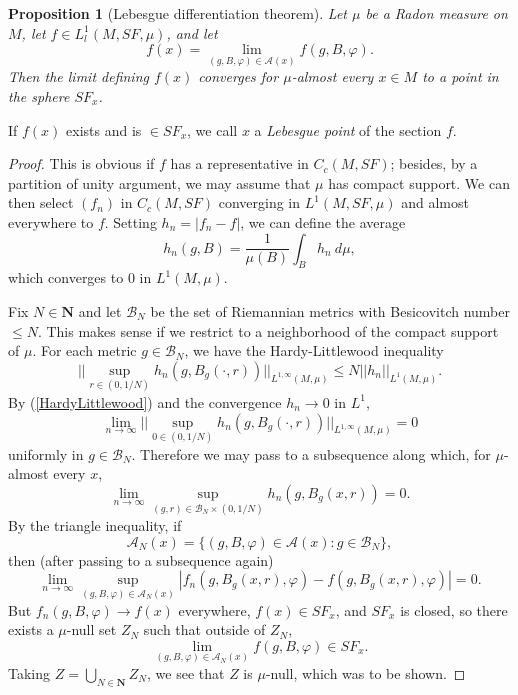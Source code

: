 \documentclass[reqno,12pt,letterpaper]{amsart}
\newcommand{\NN}{\mathbf{N}}
\newcommand{\dfn}[1]{\emph{#1}\index{#1}}
\newtheorem{proposition}[theorem]{Proposition}
\theoremstyle{definition}
\numberwithin{equation}{section}
\begin{document}
\begin{proposition}[Lebesgue differentiation theorem]\label{LebDiff}
Let $\mu$ be a Radon measure on $M$, let $f \in L^1_l(M, SF, \mu)$, and let
$$f(x) = \lim_{(g, B, \varphi) \in \mathcal A(x)} f(g, B, \varphi).$$
Then the limit defining $f(x)$ converges for $\mu$-almost every $x \in M$ to a point in the sphere $SF_x$.
\end{proposition}
If $f(x)$ exists and is $\in SF_x$, we call $x$ a \dfn{Lebesgue point} of the section $f$.
\begin{proof}
This is obvious if $f$ has a representative in $C_c(M, SF)$; besides, by a partition of unity argument, we may assume that $\mu$ has compact support.
We can then select $(f_n)$ in $C_c(M, SF)$ converging in $L^1(M, SF, \mu)$ and almost everywhere to $f$.
Setting $h_n = |f_n - f|$, we can define the average
$$h_n(g, B) = \frac{1}{\mu(B)} \int_B h_n ~d\mu,$$
which converges to $0$ in $L^1(M, \mu)$.

Fix $N \in \NN$ and let $\mathcal B_N$ be the set of Riemannian metrics with Besicovitch number $\leq N$.
This makes sense if we restrict to a neighborhood of the compact support of $\mu$.
For each metric $g \in \mathcal B_N$, we have the Hardy-Littlewood inequality \cite[Lemma 4.1.1a]{Ledrappier85}
\begin{equation}\label{HardyLittlewood}
||\sup_{r \in (0, 1/N)} h_n(g, B_g(\cdot, r))||_{L^{1, \infty}(M, \mu)} \leq N ||h_n||_{L^1(M, \mu)}.
\end{equation}
By (\ref{HardyLittlewood}) and the convergence $h_n \to 0$ in $L^1$,
$$\lim_{n \to \infty} ||\sup_{0 \in (0, 1/N)} h_n(g, B_g(\cdot, r))||_{L^{1, \infty}(M, \mu)} = 0$$
uniformly in $g \in \mathcal B_N$.
Therefore we may pass to a subsequence along which, for $\mu$-almost every $x$,
$$\lim_{n \to \infty} \sup_{(g, r) \in \mathcal B_N \times (0, 1/N)} h_n(g, B_g(x, r)) = 0.$$
By the triangle inequality, if
$$\mathcal A_N(x) = \{(g, B, \varphi) \in \mathcal A(x): g \in \mathcal B_N\},$$
then (after passing to a subsequence again)
$$\lim_{n \to \infty} \sup_{(g, B, \varphi) \in \mathcal A_N(x)} |f_n(g, B_g(x, r), \varphi) - f(g, B_g(x, r), \varphi)| = 0.$$
But $f_n(g, B, \varphi) \to f(x)$ everywhere, $f(x) \in SF_x$, and $SF_x$ is closed, so there exists a $\mu$-null set $Z_N$ such that outside of $Z_N$,
$$\lim_{(g, B, \varphi) \in \mathcal A_N(x)} f(g, B, \varphi) \in SF_x.$$
Taking $Z = \bigcup_{N \in \NN} Z_N$, we see that $Z$ is $\mu$-null, which was to be shown.
\end{proof}
\end{document}
